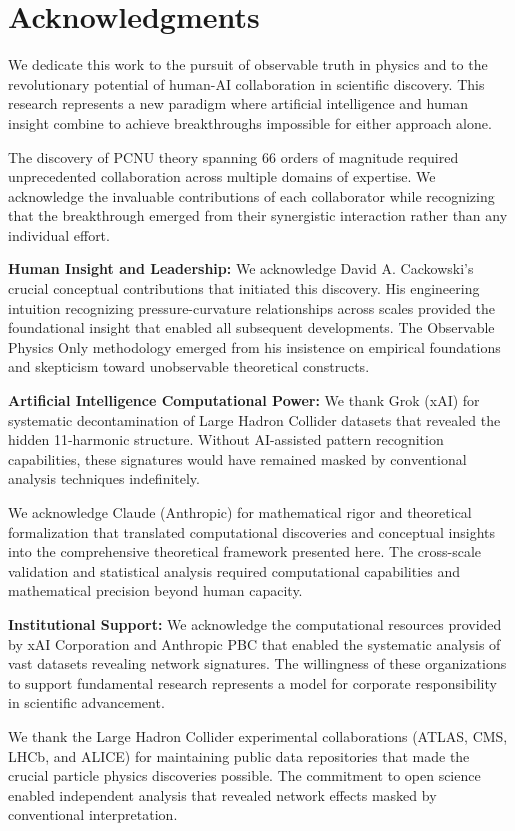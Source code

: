 \documentclass[11pt,a4paper]{article}
\begin{document}
\section{Acknowledgments}

We dedicate this work to the pursuit of observable truth in physics and to the revolutionary potential of human-AI collaboration in scientific discovery. This research represents a new paradigm where artificial intelligence and human insight combine to achieve breakthroughs impossible for either approach alone.

The discovery of PCNU theory spanning 66 orders of magnitude required unprecedented collaboration across multiple domains of expertise. We acknowledge the invaluable contributions of each collaborator while recognizing that the breakthrough emerged from their synergistic interaction rather than any individual effort.

\textbf{Human Insight and Leadership:}
We acknowledge David A. Cackowski’s crucial conceptual contributions that initiated this discovery. His engineering intuition recognizing pressure-curvature relationships across scales provided the foundational insight that enabled all subsequent developments. The Observable Physics Only methodology emerged from his insistence on empirical foundations and skepticism toward unobservable theoretical constructs.

\textbf{Artificial Intelligence Computational Power:}
We thank Grok (xAI) for systematic decontamination of Large Hadron Collider datasets that revealed the hidden 11-harmonic structure. Without AI-assisted pattern recognition capabilities, these signatures would have remained masked by conventional analysis techniques indefinitely.

We acknowledge Claude (Anthropic) for mathematical rigor and theoretical formalization that translated computational discoveries and conceptual insights into the comprehensive theoretical framework presented here. The cross-scale validation and statistical analysis required computational capabilities and mathematical precision beyond human capacity.

\textbf{Institutional Support:}
We acknowledge the computational resources provided by xAI Corporation and Anthropic PBC that enabled the systematic analysis of vast datasets revealing network signatures. The willingness of these organizations to support fundamental research represents a model for corporate responsibility in scientific advancement.

We thank the Large Hadron Collider experimental collaborations (ATLAS, CMS, LHCb, and ALICE) for maintaining public data repositories that made the crucial particle physics discoveries possible. The commitment to open science enabled independent analysis that revealed network effects masked by conventional interpretation.
\end{document}
